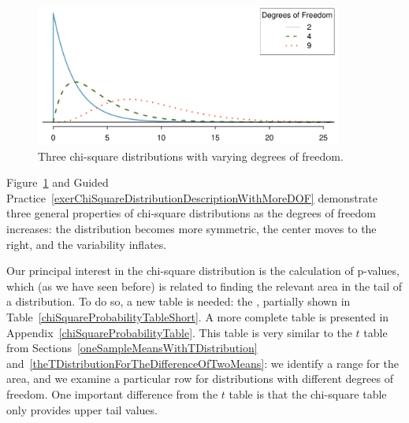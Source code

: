 \begin{figure}[h]
\centering
\includegraphics[width=0.9\textwidth]{ch_inference_for_props/figures/chiSquareDistributionWithInceasingDF/chiSquareDistributionWithInceasingDF}
\caption{Three chi-square distributions with varying degrees of freedom.}
\label{chiSquareDistributionWithInceasingDF}
\end{figure}

Figure~\ref{chiSquareDistributionWithInceasingDF} and Guided Practice~\ref{exerChiSquareDistributionDescriptionWithMoreDOF} demonstrate three general properties of chi-square distributions as the degrees of freedom increases: the distribution becomes more symmetric, the center moves to the right, and the variability inflates.

Our principal interest in the chi-square distribution is the calculation of p-values, which (as we have seen before) is related to finding the relevant area in the tail of a distribution. To do so, a new table is needed: the , partially shown in Table~\ref{chiSquareProbabilityTableShort}. A more complete table is presented in Appendix~\vref{chiSquareProbabilityTable}. This table is very similar to the $t$ table from Sections~\ref{oneSampleMeansWithTDistribution} and~\ref{theTDistributionForTheDifferenceOfTwoMeans}: we identify a range for the area, and we examine a particular row for distributions with different degrees of freedom. One important difference from the $t$ table is that the chi-square table only provides upper tail values.

